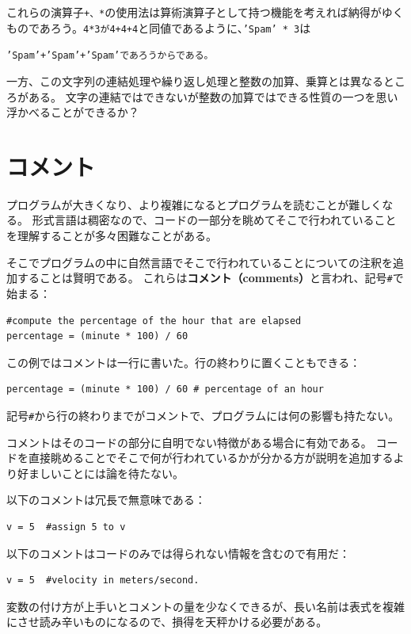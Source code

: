 \documentclass[a4j,12pt,makeidx]{jbook}
\begin{document}
これらの演算子{\tt +、*}の使用法は算術演算子として持つ機能を考えれば納得がゆくものであろう。{\tt 4*3が4+4+4}と同値であるように、{\tt 'Spam' * 3}は{\tt 'Spam'+'Spam'+'Spam'であろうからである。\par
一方、この文字列の連結処理や繰り返し処理と整数の加算、乗算とは異なるところがある。
文字の連結ではできないが整数の加算ではできる性質の一つを思い浮かべることができるか？
%
\section{コメント}
プログラムが大きくなり、より複雑になるとプログラムを読むことが難しくなる。
形式言語は稠密なので、コードの一部分を眺めてそこで行われていることを理解することが多々困難なことがある。\par
そこでプログラムの中に自然言語でそこで行われていることについての注釈を追加することは賢明である。
これらは{\bf コメント（comments）}と言われ、記号{\tt \#}で始まる：
\begin{verbatim}
#compute the percentage of the hour that are elapsed
percentage = (minute * 100) / 60
\end{verbatim}
この例ではコメントは一行に書いた。行の終わりに置くこともできる：
\begin{verbatim}
percentage = (minute * 100) / 60 # percentage of an hour
\end{verbatim}
記号{\tt \#}から行の終わりまでがコメントで、プログラムには何の影響も持たない。\par
コメントはそのコードの部分に自明でない特徴がある場合に有効である。
コードを直接眺めることでそこで何が行われているかが分かる方が説明を追加するより好ましいことには論を待たない。\par
以下のコメントは冗長で無意味である：
\begin{verbatim}
v = 5  #assign 5 to v
\end{verbatim}
以下のコメントはコードのみでは得られない情報を含むので有用だ：
\begin{verbatim}
v = 5  #velocity in meters/second.
\end{verbatim}

変数の付け方が上手いとコメントの量を少なくできるが、長い名前は表式を複雑にさせ読み辛いものになるので、損得を天秤かける必要がある。
%
}
\end{document}
